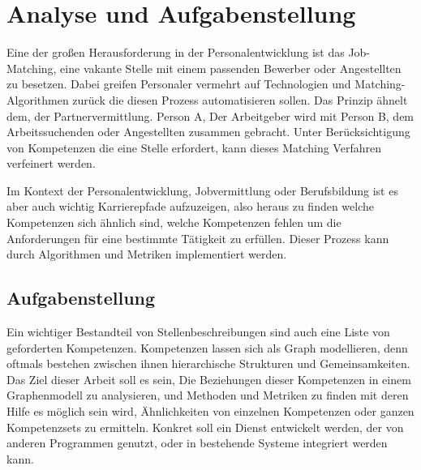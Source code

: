 \section{Analyse und Aufgabenstellung}\label{analysis}

%
%

Eine der großen Herausforderung in der Personalentwicklung ist das Job-Matching, eine vakante Stelle mit einem passenden Bewerber oder Angestellten zu besetzen. Dabei greifen Personaler vermehrt auf Technologien und Matching-Algorithmen zurück die diesen Prozess automatisieren sollen. Das Prinzip ähnelt dem, der Partnervermittlung. Person A, Der Arbeitgeber wird mit Person B, dem Arbeitssuchenden oder Angestellten zusammen gebracht. Unter Berücksichtigung von Kompetenzen die eine Stelle erfordert, kann dieses Matching Verfahren verfeinert werden.

Im Kontext der Personalentwicklung, Jobvermittlung oder Berufsbildung ist es aber auch wichtig Karrierepfade aufzuzeigen, also heraus zu finden welche Kompetenzen sich ähnlich sind, welche Kompetenzen fehlen um die Anforderungen für eine bestimmte Tätigkeit zu erfüllen. Dieser Prozess kann durch Algorithmen und Metriken implementiert werden.


\vspace{1em}

\subsection{Aufgabenstellung}

Ein wichtiger Bestandteil von Stellenbeschreibungen sind auch eine Liste von geforderten Kompetenzen. Kompetenzen lassen sich als Graph modellieren, denn oftmals bestehen zwischen ihnen hierarchische Strukturen und Gemeinsamkeiten. Das Ziel dieser Arbeit soll es sein, Die Beziehungen dieser Kompetenzen in einem Graphenmodell zu analysieren, und Methoden und Metriken zu finden mit deren Hilfe es möglich sein wird, Ähnlichkeiten von einzelnen Kompetenzen oder ganzen Kompetenzsets zu ermitteln. Konkret soll ein Dienst entwickelt werden, der von anderen Programmen genutzt, oder in bestehende Systeme integriert werden kann.

